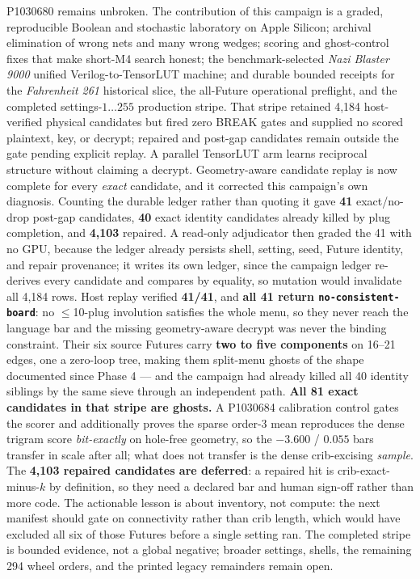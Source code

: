 \documentclass[11pt,a4paper]{article}
\begin{document}
P1030680 remains unbroken.
The contribution of this campaign is a graded, reproducible Boolean and
stochastic laboratory on Apple Silicon; archival elimination of wrong
nets and many wrong wedges; scoring and ghost-control fixes that make
short-M4 search honest; the benchmark-selected \emph{Nazi Blaster 9000}
unified Verilog-to-TensorLUT machine; and durable bounded receipts for the
\emph{Fahrenheit 261} historical slice, the all-Future operational preflight,
and the completed settings-$1\ldots255$ production stripe. That stripe retained
4{,}184 host-verified physical candidates but fired zero BREAK gates and supplied
no scored plaintext, key, or decrypt; repaired and post-gap candidates remain
outside the gate pending explicit replay. A parallel TensorLUT arm learns
reciprocal structure without claiming a decrypt.
Geometry-aware candidate replay is now complete for every \emph{exact} candidate,
and it corrected this campaign's own diagnosis. Counting the durable ledger rather
than quoting it gave \textbf{41} exact/no-drop post-gap candidates, \textbf{40}
exact identity candidates already killed by plug completion, and \textbf{4{,}103}
repaired. A read-only adjudicator then graded the 41 with no GPU, because the
ledger already persists shell, setting, seed, Future identity, and repair
provenance; it writes its own ledger, since the campaign ledger re-derives every
candidate and compares by equality, so mutation would invalidate all 4{,}184 rows.
Host replay verified \textbf{41/41}, and \textbf{all 41 return
\texttt{no-consistent-board}}: no $\le$10-plug involution satisfies the whole menu,
so they never reach the language bar and the missing geometry-aware decrypt was
never the binding constraint. Their six source Futures carry \textbf{two to five
components} on 16--21 edges, one a zero-loop tree, making them split-menu ghosts of
the shape documented since Phase 4 --- and the campaign had already killed all 40
identity siblings by the same sieve through an independent path. \textbf{All 81
exact candidates in that stripe are ghosts.} A P1030684 calibration control gates
the scorer and additionally proves the sparse order-3 mean reproduces the dense
trigram score \emph{bit-exactly} on hole-free geometry, so the $-3.600$ / $0.055$
bars transfer in scale after all; what does not transfer is the dense
crib-excising \emph{sample}. The \textbf{4{,}103 repaired candidates are deferred}:
a repaired hit is crib-exact-minus-$k$ by definition, so they need a declared bar
and human sign-off rather than more code. The actionable lesson is about inventory,
not compute: the next manifest should gate on connectivity rather than crib length,
which would have excluded all six of those Futures before a single setting ran.
The completed stripe is bounded evidence, not a global negative; broader settings,
shells, the remaining 294 wheel orders, and the printed legacy remainders remain open.
\end{document}
